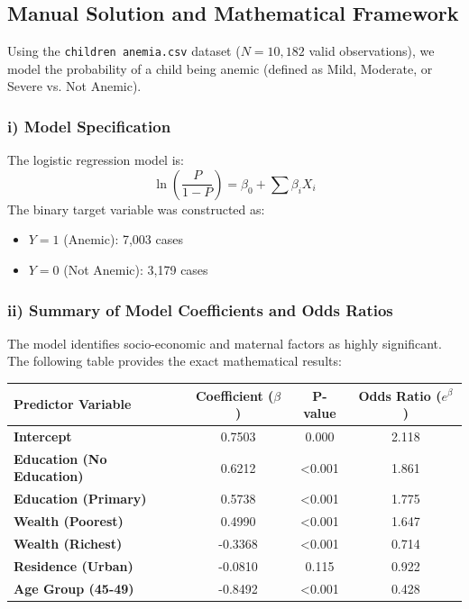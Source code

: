 \documentclass[12pt]{article}
\begin{document}
\subsection{Manual Solution and Mathematical Framework}
Using the \texttt{children anemia.csv} dataset ($N = 10,182$ valid observations), we model the probability of a child being anemic (defined as Mild, Moderate, or Severe vs. Not Anemic).

\subsubsection{i) Model Specification}
The logistic regression model is:
\[ \ln\left(\frac{P}{1-P}\right) = \beta_0 + \sum \beta_i X_i \]
The binary target variable was constructed as:
\begin{itemize}
    \item $Y=1$ (Anemic): 7,003 cases
    \item $Y=0$ (Not Anemic): 3,179 cases
\end{itemize}

\subsubsection{ii) Summary of Model Coefficients and Odds Ratios}
The model identifies socio-economic and maternal factors as highly significant. The following table provides the exact mathematical results:

\begin{table}[h!]
\centering
\begin{tabular}{@{}lccc@{}}
\toprule
Predictor Variable & Coefficient ($\beta$) & P-value & Odds Ratio ($e^\beta$) \\ \midrule
\textbf{Intercept} & 0.7503 & 0.000 & 2.118 \\
\textbf{Education (No Education)} & 0.6212 & <0.001 & 1.861 \\
\textbf{Education (Primary)} & 0.5738 & <0.001 & 1.775 \\
\textbf{Wealth (Poorest)} & 0.4990 & <0.001 & 1.647 \\
\textbf{Wealth (Richest)} & -0.3368 & <0.001 & 0.714 \\
\textbf{Residence (Urban)} & -0.0810 & 0.115 & 0.922 \\
\textbf{Age Group (45-49)} & -0.8492 & <0.001 & 0.428 \\ \bottomrule
\end{tabular}
\end{table}
\end{document}
